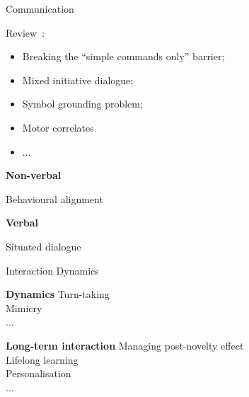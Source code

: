 \documentclass[compress]{beamer}
\begin{document}
{\begin{frame}{Communication}
\begin{multicols}{2}
    Review~\cite{mavridis2015review}:
    \begin{itemize}
        \item Breaking the ``simple commands only'' barrier;
        \item Mixed initiative dialogue;
        \item Symbol grounding problem;
        \item Motor correlates
        \item ...
    \end{itemize}


    {\bf Non-verbal}

    Behavioural alignment

    {\bf Verbal}

    Situated dialogue~\cite{kruijff2010situated}

    \end{multicols}

\end{frame}

\begin{frame}{Interaction Dynamics}

    \begin{multicols}{2}
    \vfill
    \columnbreak

    {\bf Dynamics}
    Turn-taking\\
    Mimicry\\
    ...

    {\bf Long-term interaction}
    Managing post-novelty effect\\
    Lifelong learning\\
    Personalisation\\
    ...


    \end{multicols}


\end{frame}}
\end{document}
